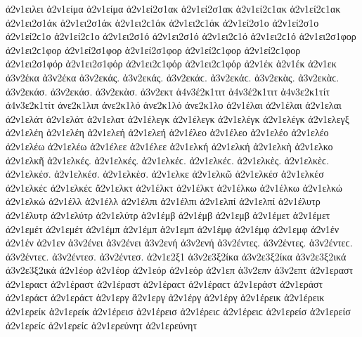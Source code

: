 {ἀ2ν1ειλει 
ἀ2ν1είμα ἀ2ν1είμα   %
ἀ2ν1εί2σ1ακ ἀ2ν1εί2σ1ακ ἀ2ν1εί2ϲ1ακ ἀ2ν1εί2ϲ1ακ   %
ἀ2ν1ει2σ1άκ ἀ2ν1ει2σ1άκ ἀ2ν1ει2ϲ1άκ ἀ2ν1ει2ϲ1άκ 
ἀ2ν1εί2σ1ο ἀ2ν1εί2σ1ο ἀ2ν1εί2ϲ1ο ἀ2ν1εί2ϲ1ο   %
ἀ2ν1ει2σ1ό ἀ2ν1ει2σ1ό ἀ2ν1ει2ϲ1ό ἀ2ν1ει2ϲ1ό 
ἀ2ν1ει2σ1φορ ἀ2ν1ει2ϲ1φορ   %
ἀ2ν1εί2σ1φορ ἀ2ν1εί2σ1φορ ἀ2ν1εί2ϲ1φορ ἀ2ν1εί2ϲ1φορ   %
ἀ2ν1ει2σ1φόρ ἀ2ν1ει2σ1φόρ ἀ2ν1ει2ϲ1φόρ ἀ2ν1ει2ϲ1φόρ 
ἀ2ν1έκ ἀ2ν1έκ   %
ἀ2ν1εκ 
ἀ3ν2έκα ἀ3ν2έκα   %
ἀ3ν2εκάς. ἀ3ν2εκάς. ἀ3ν2εκάϲ. ἀ3ν2εκάϲ.   %
ἀ3ν2εκὰς. ἀ3ν2εκὰϲ. 
ἀ3ν2εκάσ. ἀ3ν2εκάσ. 
ἀ3ν2εκὰσ. 
ἀ3ν2εκτ   %
ἀ4ν3έ2κ1τιτ ἀ4ν3έ2κ1τιτ   %
ἀ4ν3ε2κ1τίτ ἀ4ν3ε2κ1τίτ 
ἀνε2κ1λιπ   %
ἀνε2κ1λό ἀνε2κ1λό   %
ἀνε2κ1λο 
ἀ2ν1έλαι ἀ2ν1έλαι   %
ἀ2ν1ελαι 
ἀ2ν1ελάτ ἀ2ν1ελάτ   %
ἀ2ν1ελατ 
ἀ2ν1έλεγκ ἀ2ν1έλεγκ   %
ἀ2ν1ελέγκ ἀ2ν1ελέγκ 
ἀ2ν1ελεγξ   %
ἀ2ν1ελέη ἀ2ν1ελέη   %
ἀ2ν1ελεή ἀ2ν1ελεή 
ἀ2ν1έλεο ἀ2ν1έλεο   %
ἀ2ν1ελέο ἀ2ν1ελέο 
ἀ2ν1ελέω ἀ2ν1ελέω 
ἀ2ν1έλεε ἀ2ν1έλεε 
ἀ2ν1ελκή ἀ2ν1ελκή   %
ἀ2ν1ελκὴ 
ἀ2ν1ελκο 
ἀ2ν1ελκῆ 
ἀ2ν1ελκές. ἀ2ν1ελκές. ἀ2ν1ελκέϲ. ἀ2ν1ελκέϲ. 
ἀ2ν1ελκὲς. ἀ2ν1ελκὲϲ. 
ἀ2ν1ελκέσ. ἀ2ν1ελκέσ. 
ἀ2ν1ελκὲσ. 
ἀ2ν1ελκε 
ἀ2ν1ελκῶ 
ἀ2ν1ελκέσ ἀ2ν1ελκέσ ἀ2ν1ελκέϲ ἀ2ν1ελκέϲ 
ἄ2ν1ελκτ   %
ἀ2ν1έλκτ ἀ2ν1έλκτ 
ἀ2ν1έλκω ἀ2ν1έλκω   %
ἀ2ν1ελκώ ἀ2ν1ελκώ 
ἀ2ν1έλλ ἀ2ν1έλλ   %
ἀ2ν1έλπι ἀ2ν1έλπι   %
ἀ2ν1ελπί ἀ2ν1ελπί 
ἀ2ν1έλυτρ ἀ2ν1έλυτρ   %
ἀ2ν1ελύτρ ἀ2ν1ελύτρ 
ἀ2ν1έμβ ἀ2ν1έμβ   %
ἀ2ν1εμβ 
ἀ2ν1έμετ ἀ2ν1έμετ   %
ἀ2ν1εμέτ ἀ2ν1εμέτ 
ἀ2ν1έμπ ἀ2ν1έμπ   %
ἀ2ν1εμπ 
ἀ2ν1έμφ ἀ2ν1έμφ   %
ἀ2ν1εμφ 
ἀ2ν1έν ἀ2ν1έν   %
ἀ2ν1εν 
ἀ3ν2ένει ἀ3ν2ένει   %
ἀ3ν2ενή ἀ3ν2ενή   %
ἀ3ν2έντες. ἀ3ν2έντες. ἀ3ν2έντεϲ. ἀ3ν2έντεϲ.   %
ἀ3ν2έντεσ. ἀ3ν2έντεσ. 
ἀ2ν1ε2ξ1   %
ἀ3ν2ε3ξ2ίκα ἀ3ν2ε3ξ2ίκα   %
ἀ3ν2ε3ξ2ικά ἀ3ν2ε3ξ2ικά 
ἀ2ν1έορ ἀ2ν1έορ   %
ἀ2ν1εόρ ἀ2ν1εόρ 
ἀ2ν1επ   %
ἀ3ν2επν   %
ἀ3ν2επτ   %
ἀ2ν1εραστ ἀ2ν1εραϲτ   %
ἀ2ν1έραστ ἀ2ν1έραστ ἀ2ν1έραϲτ ἀ2ν1έραϲτ   %
ἀ2ν1εράστ ἀ2ν1εράστ ἀ2ν1εράϲτ ἀ2ν1εράϲτ 
ἀ2ν1εργ   %
ἄ2ν1εργ   %
ἀ2ν1έργ ἀ2ν1έργ 
ἀ2ν1έρεικ ἀ2ν1έρεικ   %
ἀ2ν1ερείκ ἀ2ν1ερείκ 
ἀ2ν1έρεισ ἀ2ν1έρεισ ἀ2ν1έρειϲ ἀ2ν1έρειϲ   %
ἀ2ν1ερείσ ἀ2ν1ερείσ ἀ2ν1ερείϲ ἀ2ν1ερείϲ 
ἀ2ν1ερεύνητ ἀ2ν1ερεύνητ   %
}
